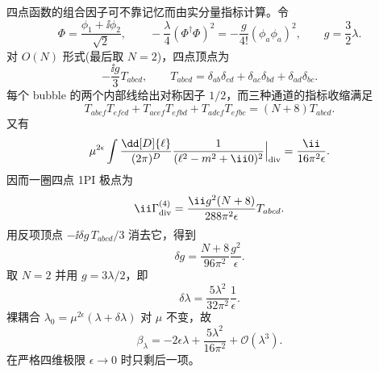 \begin{question}[40 分]
\begin{solution}
\begin{enumerate}
  四点函数的组合因子可不靠记忆而由实分量指标计算。令
  \[
  \Phi=\frac{\phi_1+\ii\phi_2}{\sqrt2},\qquad
  -\frac\lambda4(\Phi^\dagger\Phi)^2
  =-\frac{g}{4!}(\phi_a\phi_a)^2,
  \qquad g=\frac32\lambda.
  \]
  对 $O(N)$ 形式(最后取 $N=2$)，四点顶点为
  \[
  -\frac{\ii g}{3}T_{abcd},\qquad
  T_{abcd}=\delta_{ab}\delta_{cd}+\delta_{ac}\delta_{bd}+\delta_{ad}\delta_{bc}.
  \]
  每个 bubble 的两个内部线给出对称因子 $1/2$，而三种通道的指标收缩满足
  \[
  T_{abef}T_{efcd}+T_{acef}T_{efbd}+T_{adef}T_{efbc}
  =(N+8)T_{abcd}.
  \]
  又有
  \[
  \mu^{2\epsilon}\int\frac{\dd[D]{\ell}}{(2\pi)^D}
  \frac1{(\ell^2-m^2+\ii0)^2}\Big|_{\rm div}
  =\frac{\ii}{16\pi^2\epsilon}.
  \]
  因而一圈四点 1PI 极点为
  \[
  \ii\Gamma^{(4)}_{\rm div}
  =\frac{\ii g^2(N+8)}{288\pi^2\epsilon}T_{abcd}.
  \]
  用反项顶点 $-\ii\delta g\,T_{abcd}/3$ 消去它，得到
  \[
  \delta g=\frac{N+8}{96\pi^2}\frac{g^2}{\epsilon}.
  \]
  取 $N=2$ 并用 $g=3\lambda/2$，即
  \[
  \boxed{\delta\lambda=\frac{5\lambda^2}{32\pi^2}\frac1\epsilon}.
  \]
  裸耦合 $\lambda_0=\mu^{2\epsilon}(\lambda+\delta\lambda)$ 对 $\mu$ 不变，故
  \[
  \boxed{\beta_\lambda=-2\epsilon\lambda+\frac{5\lambda^2}{16\pi^2}+\mathcal O(\lambda^3)}.
  \]
  在严格四维极限 $\epsilon\to0$ 时只剩后一项。
\end{enumerate}
\end{solution}
\end{question}

